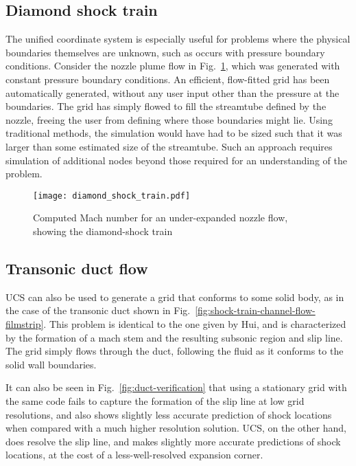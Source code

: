 \subsection{Diamond shock train}
The unified coordinate system is especially useful for problems where the physical boundaries themselves are unknown, such as occurs with pressure boundary conditions. Consider the nozzle plume flow in Fig.~\ref{fig:diamond-shock-train}, which was generated with constant pressure boundary conditions. An efficient, flow-fitted grid has been automatically generated, without any user input other than the pressure at the boundaries. The grid has simply flowed to fill the streamtube defined by the nozzle, freeing the user from defining where those boundaries might lie. Using traditional methods, the simulation would have had to be sized such that it was larger than some estimated size of the streamtube. Such an approach requires simulation of additional nodes beyond those required for an understanding of the problem.

\begin{figure}[p]
  \label{fig:diamond-shock-train}
  \centering
  \texttt{[image: diamond\_shock\_train.pdf]}
  \caption{Computed Mach number for an under-expanded nozzle flow, showing the diamond-shock train}
\end{figure}

\subsection{Transonic duct flow}
UCS can also be used to generate a grid that conforms to some solid body, as in the case of the transonic duct shown in Fig.~\ref{fig:shock-train-channel-flow-filmstrip}. This problem is identical to the one given by Hui\cite{Hui1999}, and is characterized by the formation of a mach stem and the resulting subsonic region and slip line. The grid simply flows through the duct, following the fluid as it conforms to the solid wall boundaries. 

It can also be seen in Fig.~\ref{fig:duct-verification} that using a stationary grid with the same code fails to capture the formation of the slip line at low grid resolutions, and also shows slightly less accurate prediction of shock locations when compared with a much higher resolution solution. UCS, on the other hand, does resolve the slip line, and makes slightly more accurate predictions of shock locations, at the cost of a less-well-resolved expansion corner.

